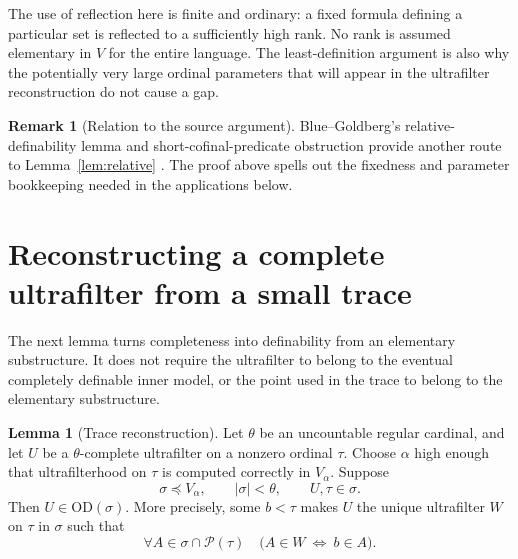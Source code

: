 \documentclass[11pt,letterpaper]{article}
\theoremstyle{definition}
\newtheorem{lemma}[definition]{Lemma}
\newcommand{\OD}{\mathrm{OD}}
\newcommand{\Pow}{\mathcal{P}}
\newtheorem{remark}[definition]{Remark}
\begin{document}
The use of reflection here is finite and ordinary: a fixed formula defining a particular set is reflected to a sufficiently high rank. No rank is assumed elementary in $V$ for the entire language. The least-definition argument is also why the potentially very large ordinal parameters that will appear in the ultrafilter reconstruction do not cause a gap.

\begin{remark}[Relation to the source argument]
Blue--Goldberg's relative-definability lemma and short-cofinal-predicate obstruction provide another route to Lemma~\ref{lem:relative} \cite[Lemma 3.3 and Observation 1]{cover}. The proof above spells out the fixedness and parameter bookkeeping needed in the applications below.
\end{remark}

\section{Reconstructing a complete ultrafilter from a small trace}\label{sec:trace}

The next lemma turns completeness into definability from an elementary substructure. It does not require the ultrafilter to belong to the eventual completely definable inner model, or the point used in the trace to belong to the elementary substructure.

\begin{lemma}[Trace reconstruction]\label{lem:trace}
Let $\theta$ be an uncountable regular cardinal, and let $U$ be a $\theta$-complete ultrafilter on a nonzero ordinal $\tau$. Choose $\alpha$ high enough that ultrafilterhood on $\tau$ is computed correctly in $V_\alpha$. Suppose
\[
       \sigma\preceq V_\alpha,
       \qquad |\sigma|<\theta,
       \qquad U,\tau\in\sigma.
\]
Then $U\in\OD(\sigma)$. More precisely, some $b<\tau$ makes $U$ the unique ultrafilter $W$ on $\tau$ in $\sigma$ such that
\begin{equation}\label{eq:trace}
 \forall A\in\sigma\cap\Pow(\tau)\quad
             \bigl(A\in W\ \Longleftrightarrow\ b\in A\bigr).
\end{equation}
\end{lemma}
\end{document}
